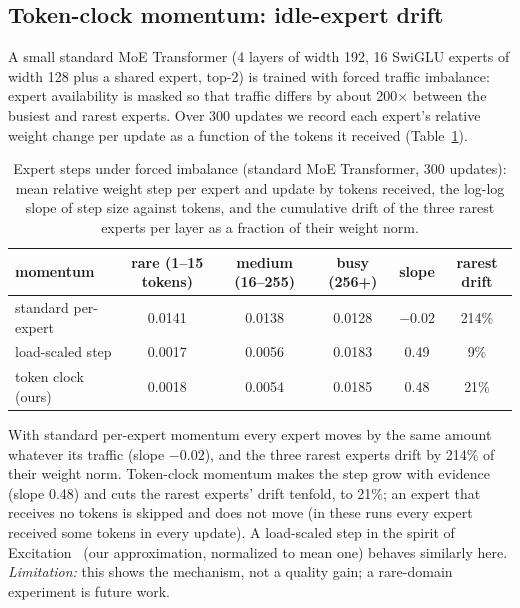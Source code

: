 \documentclass[10pt]{article}
\begin{document}
\subsection{Token-clock momentum: idle-expert drift}
\label{sec:drift}
A small standard MoE Transformer (4 layers of width 192, 16 SwiGLU experts of width 128 plus a shared expert, top-2)
is trained with forced traffic imbalance: expert availability is masked so that traffic differs by about
200$\times$ between the busiest and rarest experts. Over 300 updates we record each expert's relative weight change per
update as a function of the tokens it received (Table~\ref{tab:drift}).

\begin{table}[!t]
\centering\small
\caption{Expert steps under forced imbalance (standard MoE Transformer, 300 updates): mean relative weight step per
expert and update by tokens received, the log-log slope of step size against tokens, and the cumulative drift of the
three rarest experts per layer as a fraction of their weight norm.}
\label{tab:drift}
\begin{tabular}{lccccc}
\toprule
momentum & rare (1--15 tokens) & medium (16--255) & busy (256+) & slope & rarest drift \\
\midrule
standard per-expert & 0.0141 & 0.0138 & 0.0128 & $-0.02$ & 214\% \\
load-scaled step & 0.0017 & 0.0056 & 0.0183 & 0.49 & 9\% \\
\rowcolor{ours!12} token clock (ours) & 0.0018 & 0.0054 & 0.0185 & 0.48 & 21\% \\
\bottomrule
\end{tabular}
\end{table}

With standard per-expert momentum every expert moves by the same amount whatever its traffic (slope $-0.02$), and the
three rarest experts drift by 214\% of their weight norm. Token-clock momentum makes the step grow with evidence
(slope 0.48) and cuts the rarest experts' drift tenfold, to 21\%; an expert that receives no tokens is skipped and does
not move (in these runs every expert received some tokens in every update). A load-scaled step in the spirit of
Excitation~\citep{shaier2026excitation} (our approximation, normalized to mean one) behaves similarly here. \emph{Limitation:}
this shows the mechanism, not a quality gain; a rare-domain experiment is future work.

\end{document}
